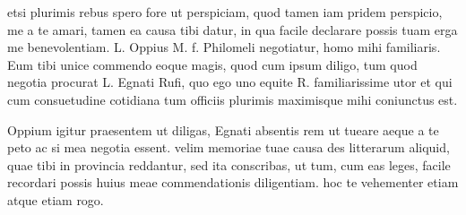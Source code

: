 


 etsi plurimis rebus spero fore ut perspiciam, quod tamen iam pridem perspicio, me a te amari, tamen ea causa tibi datur, in qua facile declarare possis tuam erga me benevolentiam. L. Oppius M. f. Philomeli negotiatur, homo mihi familiaris. Eum tibi unice commendo eoque magis, quod cum ipsum diligo, tum quod negotia procurat L. Egnati Rufi, quo ego uno equite R. familiarissime utor et qui cum consuetudine cotidiana tum officiis plurimis maximisque mihi coniunctus est.

 Oppium igitur praesentem ut diligas, Egnati absentis rem ut tueare aeque a te peto ac si mea negotia essent. velim memoriae tuae causa des litterarum aliquid, quae tibi in provincia reddantur, sed ita conscribas, ut tum, cum eas leges, facile recordari possis huius meae commendationis diligentiam. hoc te vehementer etiam atque etiam rogo.
